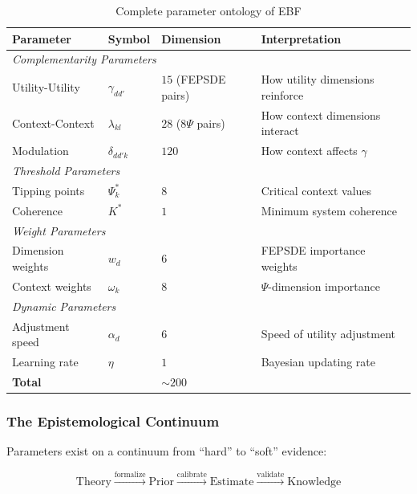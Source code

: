 \begin{table}[h]
\centering
\small
\begin{tabular}{p{2.5cm}p{2cm}p{3cm}p{4.5cm}}
\toprule
\textbf{Parameter} & \textbf{Symbol} & \textbf{Dimension} & \textbf{Interpretation} \\
\midrule
\multicolumn{4}{l}{\textit{Complementarity Parameters}} \\
Utility-Utility & $\gamma_{dd'}$ & $15$ (FEPSDE pairs) & How utility dimensions reinforce \\
Context-Context & $\lambda_{kl}$ & $28$ (8$\Psi$ pairs) & How context dimensions interact \\
Modulation & $\delta_{dd'k}$ & $120$ & How context affects $\gamma$ \\
\midrule
\multicolumn{4}{l}{\textit{Threshold Parameters}} \\
Tipping points & $\Psi^*_k$ & $8$ & Critical context values \\
Coherence & $K^*$ & $1$ & Minimum system coherence \\
\midrule
\multicolumn{4}{l}{\textit{Weight Parameters}} \\
Dimension weights & $w_d$ & $6$ & FEPSDE importance weights \\
Context weights & $\omega_k$ & $8$ & $\Psi$-dimension importance \\
\midrule
\multicolumn{4}{l}{\textit{Dynamic Parameters}} \\
Adjustment speed & $\alpha_d$ & $6$ & Speed of utility adjustment \\
Learning rate & $\eta$ & $1$ & Bayesian updating rate \\
\midrule
\textbf{Total} & & \textbf{$\sim 200$} & \\
\bottomrule
\end{tabular}
\caption{Complete parameter ontology of EBF}
\label{tab:parameter-ontology}
\end{table}

\subsubsection{The Epistemological Continuum}

Parameters exist on a continuum from ``hard'' to ``soft'' evidence:

\begin{equation}
\text{Theory} \xrightarrow{\text{formalize}} \text{Prior} \xrightarrow{\text{calibrate}} \text{Estimate} \xrightarrow{\text{validate}} \text{Knowledge}
\end{equation}

